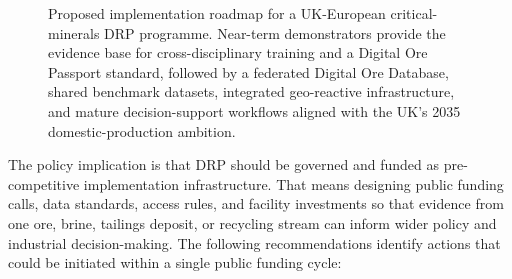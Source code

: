 \documentclass[12pt,a4paper]{article}
\begin{document}
\begin{figure}[htbp]
{%
}
\caption{Proposed implementation roadmap for a UK-European critical-minerals DRP programme. Near-term demonstrators provide the evidence base for cross-disciplinary training and a Digital Ore Passport standard, followed by a federated Digital Ore Database, shared benchmark datasets, integrated geo-reactive infrastructure, and mature decision-support workflows aligned with the UK's 2035 domestic-production ambition.}
\label{fig:implementation_roadmap}
\end{figure}

\FloatBarrier
\clearpage
{}

The policy implication is that DRP should be governed and funded as pre-competitive implementation infrastructure. That means designing public funding calls, data standards, access rules, and facility investments so that evidence from one ore, brine, tailings deposit, or recycling stream can inform wider policy and industrial decision-making. The following recommendations identify actions that could be initiated within a single public funding cycle:
\end{document}
